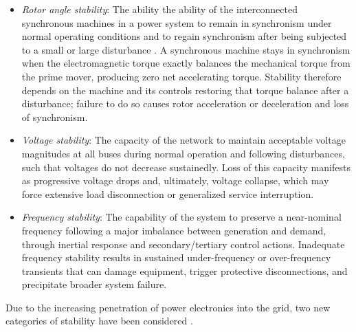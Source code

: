 \begin{itemize}
    \item \textit{Rotor angle stability}: The ability the ability of the interconnected synchronous machines in a power system 
    to remain in synchronism under normal operating conditions and to regain synchronism after being subjected to a
     small or large disturbance \cite{StabilityAndControlKundur}. A synchronous machine stays in synchronism when the 
     electromagnetic torque exactly balances the mechanical torque from the prime mover, producing zero net accelerating torque. 
     Stability therefore depends on the machine and its controls restoring that torque balance after a disturbance; failure to do 
     so causes rotor acceleration or deceleration and loss of synchronism.
    \item \textit{Voltage stability}: The capacity of the network to maintain acceptable voltage magnitudes at all buses 
    during normal operation and following disturbances, such that voltages do not decrease sustainedly. Loss of this 
    capacity manifests as progressive voltage drops and, ultimately, voltage collapse, which may force extensive load disconnection 
    or generalized service interruption.
    \item \textit{Frequency stability}: The capability of the system to preserve a near-nominal frequency following a major 
    imbalance between generation and demand, through inertial response and secondary/tertiary control actions. Inadequate frequency 
    stability results in sustained under-frequency or over-frequency transients that can damage equipment, trigger protective disconnections, 
    and precipitate broader system failure.
\end{itemize}

Due to the increasing penetration of power electronics into the grid, two new categories of stability have been considered \cite{DefStabExtended}.

